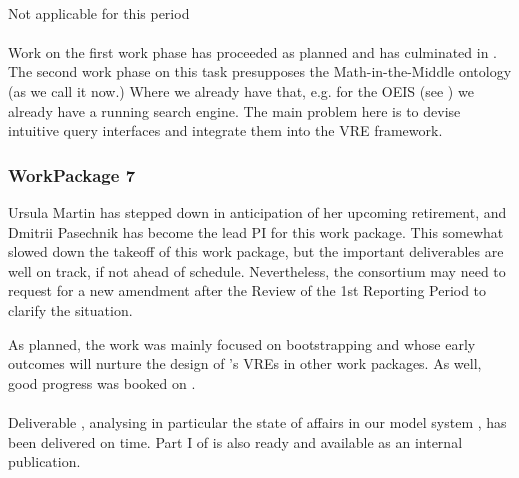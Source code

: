 \documentclass{deliverablereport}
\begin{document}
  \paragraph{}
  Not applicable for this period
  
  \paragraph{}
  Work on the first work phase has proceeded as planned and has culminated in
  . The second work phase on this task presupposes the
  Math-in-the-Middle ontology (as we call it now.) Where we already have that, e.g. for
  the OEIS (see ) we already have a running search
  engine. The main problem here is to devise intuitive query interfaces and integrate them
  into the \pn VRE framework.


  \subsubsection{WorkPackage 7}
  Ursula Martin has stepped down in anticipation of her upcoming retirement, and Dmitrii
  Pasechnik has become the lead PI for this work package.  This somewhat slowed down the
  takeoff of this work package, but the important deliverables are well on track, if not
  ahead of schedule. Nevertheless, the consortium may need to request for a new amendment
  after the Review of the 1st Reporting Period to clarify the situation.

  As planned, the work was mainly focused on bootstrapping
   and
   whose early outcomes will nurture
  the design of \ODK's VREs in other work packages. As well, good progress was booked
  on  .

  \paragraph{} %
  Deliverable ,
  analysing in particular the state of
  affairs in our model system \Sage, has been delivered on time.
  Part I of  is also ready and available
  as an internal publication.
\end{document}
